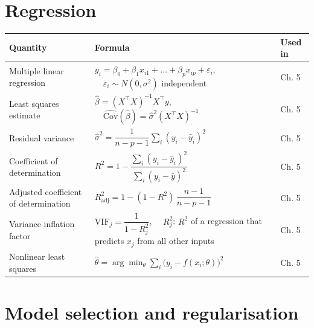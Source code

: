 \documentclass[
  letterpaper,
  DIV=11,
  numbers=noendperiod]{scrreprt}
\begin{document}
\section{Regression}\label{regression}

\begin{longtable}[]{@{}
  >{\raggedright\arraybackslash}p{}
  >{\raggedright\arraybackslash}p{}
  >{\raggedright\arraybackslash}p{}@{}}
\toprule\noalign{}
\begin{minipage}[b]{\linewidth}\raggedright
Quantity
\end{minipage} & \begin{minipage}[b]{\linewidth}\raggedright
Formula
\end{minipage} & \begin{minipage}[b]{\linewidth}\raggedright
Used in
\end{minipage} \\
\midrule\noalign{}
\endhead
\bottomrule\noalign{}
\endlastfoot
Multiple linear regression &
\(y_i = \beta_0 + \beta_1 x_{i1} + \dots + \beta_p x_{ip} + \varepsilon_i\),
\(\quad \varepsilon_i \sim N(0, \sigma^2)\) independent & Ch. 5 \\
Least squares estimate & \(\hat\beta = (X^\top X)^{-1} X^\top y\),
\(\quad \widehat{\text{Cov}}(\hat\beta) = \hat\sigma^2 (X^\top X)^{-1}\)
& Ch. 5 \\
Residual variance &
\(\hat\sigma^2 = \dfrac{1}{n - p - 1}\sum_i (y_i - \hat y_i)^2\) & Ch.
5 \\
Coefficient of determination &
\(R^2 = 1 - \dfrac{\sum_i (y_i - \hat y_i)^2}{\sum_i (y_i - \bar y)^2}\)
& Ch. 5 \\
Adjusted coefficient of determination &
\(R^2_{\text{adj}} = 1 - (1 - R^2)\,\dfrac{n - 1}{n - p - 1}\) & Ch.
5 \\
Variance inflation factor & \(\text{VIF}_j = \dfrac{1}{1 - R_j^2}\),
\(\quad R_j^2\): \(R^2\) of a regression that predicts \(x_j\) from all
other inputs & Ch. 5 \\
Nonlinear least squares &
\(\hat\theta = \arg\min_{\theta} \sum_i \big(y_i - f(x_i; \theta)\big)^2\)
& Ch. 5 \\
\end{longtable}

\section{Model selection and
regularisation}\label{model-selection-and-regularisation}
\end{document}
